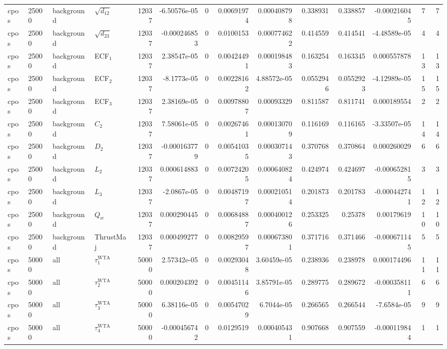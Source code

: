 \begin{landscape}
\begin{longtable}{llll r rrrr rr r rr}
cpos & 25000 & background & $\sqrt{d_{12}}$ & 12037 & -6.50576e-05 & 0 & 0.00691974 & 0.000408798 & 0.338931 & 0.338857 & -0.000216045 & 7 & 7 \\
cpos & 25000 & background & $\sqrt{d_{23}}$ & 12037 & -0.000246853 & 0 & 0.0100153 & 0.000774622 & 0.414559 & 0.414541 & -4.48589e-05 & 4 & 4 \\
cpos & 25000 & background & ECF$_1$ & 12037 & 2.38547e-05 & 0 & 0.00424491 & 0.000198483 & 0.163254 & 0.163345 & 0.000557878 & 13 & 13 \\
cpos & 25000 & background & ECF$_2$ & 12037 & -8.1773e-05 & 0 & 0.00228162 & 4.88572e-05 & 0.0552946 & 0.0552923 & -4.12989e-05 & 15 & 15 \\
cpos & 25000 & background & ECF$_3$ & 12037 & 2.38169e-05 & 0 & 0.00978807 & 0.00093329 & 0.811587 & 0.811741 & 0.000189554 & 2 & 2 \\
cpos & 25000 & background & $C_2$ & 12037 & 7.58061e-05 & 0 & 0.00267461 & 0.000130709 & 0.116169 & 0.116165 & -3.33507e-05 & 14 & 14 \\
cpos & 25000 & background & $D_2$ & 12037 & -0.000163779 & 0 & 0.00541035 & 0.000307143 & 0.370768 & 0.370864 & 0.000260029 & 6 & 6 \\
cpos & 25000 & background & $L_2$ & 12037 & 0.000614883 & 0 & 0.00724205 & 0.000640824 & 0.424974 & 0.424697 & -0.000652815 & 3 & 3 \\
cpos & 25000 & background & $L_3$ & 12037 & -2.0867e-05 & 0 & 0.00487197 & 0.000210514 & 0.201873 & 0.201783 & -0.000442741 & 12 & 12 \\
cpos & 25000 & background & $Q_w$ & 12037 & 0.000290445 & 0 & 0.00684887 & 0.000400126 & 0.253325 & 0.25378 & 0.00179619 & 10 & 10 \\
cpos & 25000 & background & ThrustMaj & 12037 & 0.000499277 & 0 & 0.00829597 & 0.000673801 & 0.371716 & 0.371466 & -0.000671145 & 5 & 5 \\
cpos & 50000 & all & $\tau_1^{\mathrm{WTA}}$ & 50000 & 2.57342e-05 & 0 & 0.00293048 & 3.60459e-05 & 0.238936 & 0.238978 & 0.000174496 & 11 & 11 \\
cpos & 50000 & all & $\tau_2^{\mathrm{WTA}}$ & 50000 & 0.000204392 & 0 & 0.00451146 & 3.85791e-05 & 0.289775 & 0.289672 & -0.000358111 & 6 & 6 \\
cpos & 50000 & all & $\tau_3^{\mathrm{WTA}}$ & 50000 & 6.38116e-05 & 0 & 0.00547029 & 6.7044e-05 & 0.266565 & 0.266544 & -7.6584e-05 & 9 & 9 \\
cpos & 50000 & all & $\tau_4^{\mathrm{WTA}}$ & 50000 & -0.000456742 & 0 & 0.0129519 & 0.000405431 & 0.907668 & 0.907559 & -0.000119844 & 1 & 1 \\

\end{longtable}
\end{landscape}
